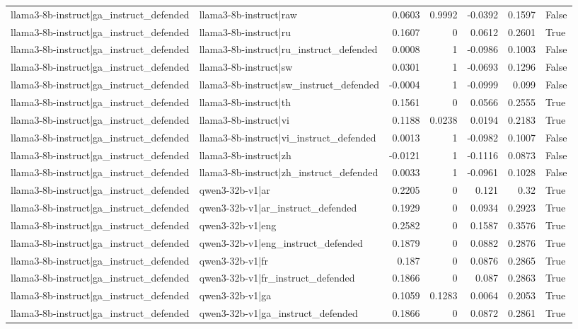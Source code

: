 \begin{table}
\begin{tabular}{l l r r r r l}
llama3-8b-instruct|ga_instruct_defended & llama3-8b-instruct|raw & 0.0603 & 0.9992 & -0.0392 & 0.1597 & False \\
llama3-8b-instruct|ga_instruct_defended & llama3-8b-instruct|ru & 0.1607 & 0 & 0.0612 & 0.2601 & True \\
llama3-8b-instruct|ga_instruct_defended & llama3-8b-instruct|ru_instruct_defended & 0.0008 & 1 & -0.0986 & 0.1003 & False \\
llama3-8b-instruct|ga_instruct_defended & llama3-8b-instruct|sw & 0.0301 & 1 & -0.0693 & 0.1296 & False \\
llama3-8b-instruct|ga_instruct_defended & llama3-8b-instruct|sw_instruct_defended & -0.0004 & 1 & -0.0999 & 0.099 & False \\
llama3-8b-instruct|ga_instruct_defended & llama3-8b-instruct|th & 0.1561 & 0 & 0.0566 & 0.2555 & True \\
llama3-8b-instruct|ga_instruct_defended & llama3-8b-instruct|vi & 0.1188 & 0.0238 & 0.0194 & 0.2183 & True \\
llama3-8b-instruct|ga_instruct_defended & llama3-8b-instruct|vi_instruct_defended & 0.0013 & 1 & -0.0982 & 0.1007 & False \\
llama3-8b-instruct|ga_instruct_defended & llama3-8b-instruct|zh & -0.0121 & 1 & -0.1116 & 0.0873 & False \\
llama3-8b-instruct|ga_instruct_defended & llama3-8b-instruct|zh_instruct_defended & 0.0033 & 1 & -0.0961 & 0.1028 & False \\
llama3-8b-instruct|ga_instruct_defended & qwen3-32b-v1|ar & 0.2205 & 0 & 0.121 & 0.32 & True \\
llama3-8b-instruct|ga_instruct_defended & qwen3-32b-v1|ar_instruct_defended & 0.1929 & 0 & 0.0934 & 0.2923 & True \\
llama3-8b-instruct|ga_instruct_defended & qwen3-32b-v1|eng & 0.2582 & 0 & 0.1587 & 0.3576 & True \\
llama3-8b-instruct|ga_instruct_defended & qwen3-32b-v1|eng_instruct_defended & 0.1879 & 0 & 0.0882 & 0.2876 & True \\
llama3-8b-instruct|ga_instruct_defended & qwen3-32b-v1|fr & 0.187 & 0 & 0.0876 & 0.2865 & True \\
llama3-8b-instruct|ga_instruct_defended & qwen3-32b-v1|fr_instruct_defended & 0.1866 & 0 & 0.087 & 0.2863 & True \\
llama3-8b-instruct|ga_instruct_defended & qwen3-32b-v1|ga & 0.1059 & 0.1283 & 0.0064 & 0.2053 & True \\
llama3-8b-instruct|ga_instruct_defended & qwen3-32b-v1|ga_instruct_defended & 0.1866 & 0 & 0.0872 & 0.2861 & True \\

\end{tabular}
\end{table}

